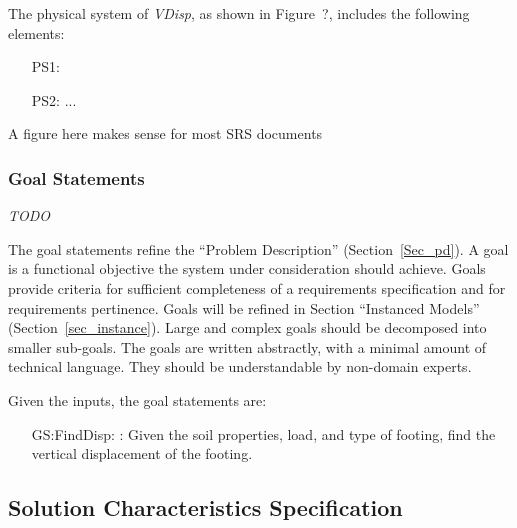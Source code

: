 \documentclass[12pt]{article}
\begin{document}
The physical system of \emph{VDisp}{}, as shown in Figure~?,
includes the following elements:

\begin{itemize}

\item[PS1:] 

\item[PS2:] ...

\end{itemize}

A figure here makes sense for most SRS documents


\subsubsection{Goal Statements}

\emph{TODO}

The goal statements refine the ``Problem Description'' (Section~\ref{Sec_pd}).
A goal is a functional objective the system under consideration should achieve.
Goals provide criteria for sufficient completeness of a requirements
specification and for requirements pertinence. Goals will be refined in Section
“Instanced Models” (Section~\ref{sec_instance}). Large and complex goals should
be decomposed into smaller sub-goals.  The goals are written abstractly, with a
minimal amount of technical language.  They should be understandable by
non-domain experts.

\noindent Given the inputs, the goal statements are:

\begin{itemize}

\item[GS:FindDisp:\phantomsection\label{GS:FindDisp}]: Given the soil
properties, load, and type of footing, find the vertical displacement of the
footing.

\end{itemize}

\subsection{Solution Characteristics Specification}
\end{document}
